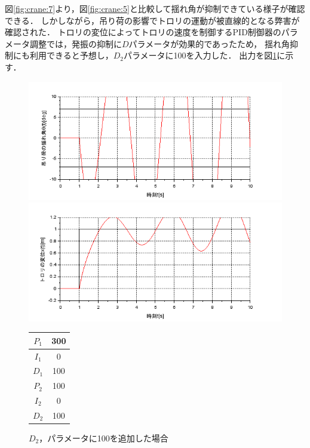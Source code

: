 \documentclass[dvipdfmx,titlepage,a4j]{jsarticle}  %
\begin{document}
図\ref{fig:crane:7}より，図\ref{fig:crane:5}と比較して揺れ角が抑制できている様子が確認できる．
しかしながら，吊り荷の影響でトロリの運動が被直線的となる弊害が確認された．
トロリの変位によってトロリの速度を制御するPID制御器のパラメータ調整では，発振の抑制に$D$パラメータが効果的であったため，
揺れ角抑制にも利用できると予想し，$D_2$パラメータに100を入力した．
出力を図\ref{fig:crane:8}に示す．

\begin{figure}[H]
  \begin{minipage}{4.5cm}
    \centering
    \includegraphics[keepaspectratio, scale=0.35]{../graph/crane/po-P1-300-I1-0-D1-100-P2-100-I2-0-D2-100.png}
  \end{minipage}
  \hfill
  \begin{minipage}{4.5cm}
    \centering
    \includegraphics[keepaspectratio, scale=0.35]{../graph/crane/ang-P1-300-I1-0-D1-100-P2-100-I2-0-D2-100.png}
  \end{minipage}
  \hfill
  \begin{minipage}{3cm}
    \begin{center}
      \begin{tabular}{c|c}
        \hline
        $P_1$ & 300\\ \hline
        $I_1$ & 0\\ \hline
        $D_1$ & 100\\ \hline
        $P_2$ & 100\\ \hline
        $I_2$ & 0\\ \hline
        $D_2$ & 100\\
        \hline
      \end{tabular}
    \end{center}
  \end{minipage}
  \hfill
  \caption{$D_2$，パラメータに100を追加した場合}
  \label{fig:crane:8}
\end{figure}
\end{document}
